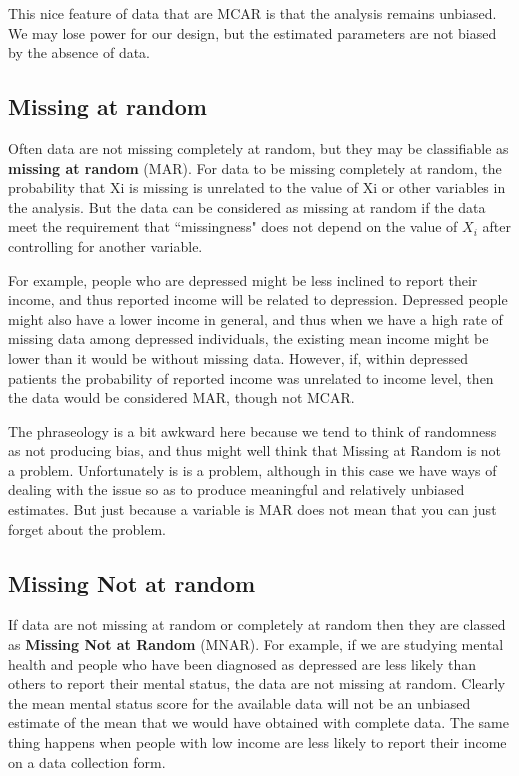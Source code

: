 \documentclass[12pt, a4paper]{report}
\begin{document}
This nice feature of data that are MCAR is that the analysis remains unbiased. We may lose power for our design, but the estimated parameters are not biased by the absence of data.

\subsection{Missing at random}
Often data are not missing completely at random, but they may be classifiable as \textbf{missing at random} (MAR). For data to be missing completely at random, the probability that Xi is missing is unrelated to the value of Xi or other variables in the analysis. But the data can be considered as missing at random if the data meet the requirement that ``missingness" does not depend on the value of $X_i$ after controlling for another variable.

For example, people who are depressed might be less inclined to report their income, and thus reported income will be related to depression. Depressed people might also have a lower income in general, and thus when we have a high rate of missing data among depressed individuals, the existing mean income might be lower than it would be without missing data. However, if, within depressed patients the probability of reported income was unrelated to income level, then the data would be considered MAR, though not MCAR.

The phraseology is a bit awkward here because we tend to think of randomness as not producing bias, and thus might well think that Missing at Random is not a problem. Unfortunately is is a problem, although in this case we have ways of dealing with the issue so as to produce meaningful and relatively unbiased estimates. But just because a variable is MAR does not mean that you can just forget about the problem.

\subsection{Missing Not at random}
If data are not missing at random or completely at random then they are classed as \textbf{Missing Not at Random} (MNAR). For example, if we are studying mental health and people who have been diagnosed as depressed are less likely than others to report their mental status, the data are not missing at random. Clearly the mean mental status score for the available data will not be an unbiased estimate of the mean that we would have obtained with complete data. The same thing happens when people with low income are less likely to report their income on a data collection form.
\end{document}
